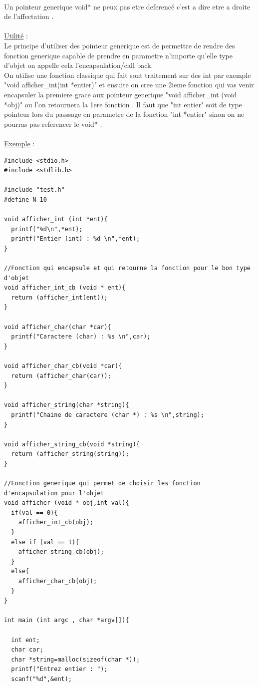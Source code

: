 \documentclass[a4paper,12pt,openany]{book}
\begin{document}
{\begin{verbatim}
\end{verbatim}
\\
Un pointeur generique void* ne peux pas etre deferencé c'est a dire etre a droite de l'affectation .\\
\\
\underline{Utilité} : \\
Le principe d'utiliser des pointeur generique est de permettre de rendre des fonction generique capable de prendre en parametre n'importe qu'elle type d'objet on appelle cela l'encapsulation/call back.\\
On utilise une fonction classique qui fait sont traitement sur des int par exemple "void afficher\_int(int *entier)" et ensuite on cree une 2ieme fonction qui vas venir encapsuler la premiere grace aux pointeur generique "void afficher\_int (void *obj)" ou l'on retournera la 1ere fonction .
Il faut que "int entier" soit de type pointeur lors du passsage en parametre de la fonction "int *entier" sinon on ne pourras pas referencer le void* .\\  
\\
\underline{Exemple} : \\
\begin{verbatim}
#include <stdio.h>
#include <stdlib.h>

#include "test.h"
#define N 10

void afficher_int (int *ent){
  printf("%d\n",*ent);
  printf("Entier (int) : %d \n",*ent);
}

//Fonction qui encapsule et qui retourne la fonction pour le bon type d'objet
void afficher_int_cb (void * ent){
  return (afficher_int(ent));
}

void afficher_char(char *car){
  printf("Caractere (char) : %s \n",car);
}

void afficher_char_cb(void *car){
  return (afficher_char(car));
}

void afficher_string(char *string){
  printf("Chaine de caractere (char *) : %s \n",string);
}

void afficher_string_cb(void *string){
  return (afficher_string(string));
}

//Fonction generique qui permet de choisir les fonction d'encapsulation pour l'objet 
void afficher (void * obj,int val){
  if(val == 0){
    afficher_int_cb(obj);
  }
  else if (val == 1){
    afficher_string_cb(obj);
  }
  else{
    afficher_char_cb(obj);
  }
}

int main (int argc , char *argv[]){

  int ent;
  char car;
  char *string=malloc(sizeof(char *));
  printf("Entrez entier : ");
  scanf("%d",&ent);


\end{verbatim}}
\end{document}
